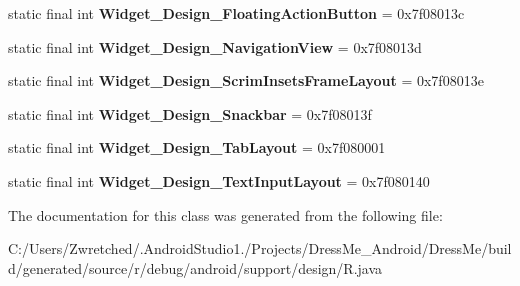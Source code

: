 \begin{DoxyCompactItemize}
\item 
\hypertarget{classandroid_1_1support_1_1design_1_1_r_1_1style_a08935d376825ff3b7d17aec27397cf9d}{}static final int {\bfseries Widget\+\_\+\+Design\+\_\+\+Floating\+Action\+Button} = 0x7f08013c\label{classandroid_1_1support_1_1design_1_1_r_1_1style_a08935d376825ff3b7d17aec27397cf9d}

\item 
\hypertarget{classandroid_1_1support_1_1design_1_1_r_1_1style_ab1b972b922c73220c4cbf8cd7c235fe7}{}static final int {\bfseries Widget\+\_\+\+Design\+\_\+\+Navigation\+View} = 0x7f08013d\label{classandroid_1_1support_1_1design_1_1_r_1_1style_ab1b972b922c73220c4cbf8cd7c235fe7}

\item 
\hypertarget{classandroid_1_1support_1_1design_1_1_r_1_1style_a87e6d222c0aa6cdb22bd196a42738102}{}static final int {\bfseries Widget\+\_\+\+Design\+\_\+\+Scrim\+Insets\+Frame\+Layout} = 0x7f08013e\label{classandroid_1_1support_1_1design_1_1_r_1_1style_a87e6d222c0aa6cdb22bd196a42738102}

\item 
\hypertarget{classandroid_1_1support_1_1design_1_1_r_1_1style_a39ee29a1451944b167ccbe405224a219}{}static final int {\bfseries Widget\+\_\+\+Design\+\_\+\+Snackbar} = 0x7f08013f\label{classandroid_1_1support_1_1design_1_1_r_1_1style_a39ee29a1451944b167ccbe405224a219}

\item 
\hypertarget{classandroid_1_1support_1_1design_1_1_r_1_1style_a4e18e9a3dd0772b01328ac0bb36863e7}{}static final int {\bfseries Widget\+\_\+\+Design\+\_\+\+Tab\+Layout} = 0x7f080001\label{classandroid_1_1support_1_1design_1_1_r_1_1style_a4e18e9a3dd0772b01328ac0bb36863e7}

\item 
\hypertarget{classandroid_1_1support_1_1design_1_1_r_1_1style_aa16e720283622554378e2d9ea5437fdf}{}static final int {\bfseries Widget\+\_\+\+Design\+\_\+\+Text\+Input\+Layout} = 0x7f080140\label{classandroid_1_1support_1_1design_1_1_r_1_1style_aa16e720283622554378e2d9ea5437fdf}

\end{DoxyCompactItemize}


The documentation for this class was generated from the following file\+:\begin{DoxyCompactItemize}
\item 
C\+:/\+Users/\+Zwretched/.\+Android\+Studio1./\+Projects/\+Dress\+Me\+\_\+\+Android/\+Dress\+Me/build/generated/source/r/debug/android/support/design/R.\+java\end{DoxyCompactItemize}
